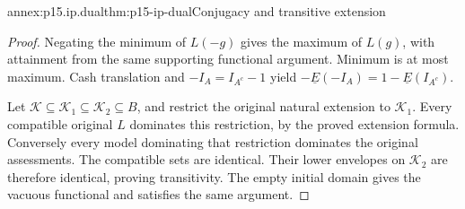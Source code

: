 \begin{annexitem}{annex:p15.ip.dual}{thm:p15-ip-dual}{Conjugacy and transitive extension}
\begin{proof}
Negating the minimum of \(L(-g)\) gives the maximum of \(L(g)\),
with attainment from the same supporting functional argument. Minimum
is at most maximum. Cash translation and
\(-I_A=I_{A^c}-1\) yield
\(-\underline E(-I_A)=1-\underline E(I_{A^c})\).

Let \(\mathcal K\subseteq\mathcal K_1\subseteq\mathcal K_2\subseteq B\),
and restrict the original natural extension to \(\mathcal K_1\).
Every compatible original \(L\) dominates this restriction, by the
proved extension formula. Conversely every model dominating that
restriction dominates the original assessments. The compatible sets
are identical. Their lower envelopes on \(\mathcal K_2\) are
therefore identical, proving transitivity. The empty initial domain
gives the vacuous functional and satisfies the same argument.
\end{proof}
\end{annexitem}

